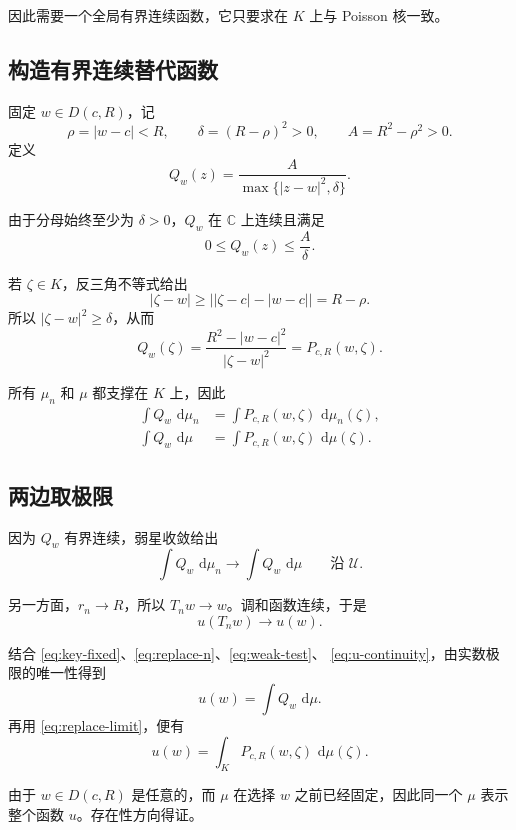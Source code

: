 \documentclass[11pt,a4paper]{article}
\theoremstyle{cnplain}
\theoremstyle{definition}
\newcommand{\C}{\mathbb C}
\newcommand{\dd}{\,\mathrm d}
\begin{document}
因此需要一个全局有界连续函数，它只要求在 $K$ 上与 Poisson 核一致。

\subsection{构造有界连续替代函数}

固定 $w\in D(c,R)$，记
\[
  \rho=|w-c|<R,\qquad
  \delta=(R-\rho)^2>0,\qquad
  A=R^2-\rho^2>0.
\]
定义
\begin{equation}\label{eq:Q-def}
  Q_w(z)=\frac{A}{\max\{|z-w|^2,\delta\}}.
\end{equation}

由于分母始终至少为 $\delta>0$，$Q_w$ 在 $\C$ 上连续且满足
\[
  0\le Q_w(z)\le \frac{A}{\delta}.
\]

若 $\zeta\in K$，反三角不等式给出
\[
  |\zeta-w|
  \ge\bigl||\zeta-c|-|w-c|\bigr|
  =R-\rho.
\]
所以 $|\zeta-w|^2\ge\delta$，从而
\[
  Q_w(\zeta)
  =\frac{R^2-|w-c|^2}{|\zeta-w|^2}
  =P_{c,R}(w,\zeta).
\]

所有 $\mu_n$ 和 $\mu$ 都支撑在 $K$ 上，因此
\begin{align}
  \int Q_w\,\dd\mu_n&=\int P_{c,R}(w,\zeta)\,\dd\mu_n(\zeta),
    \label{eq:replace-n}\\
  \int Q_w\,\dd\mu&=\int P_{c,R}(w,\zeta)\,\dd\mu(\zeta).
    \label{eq:replace-limit}
\end{align}

\subsection{两边取极限}

因为 $Q_w$ 有界连续，弱星收敛给出
\begin{equation}\label{eq:weak-test}
  \int Q_w\,\dd\mu_n
  \longrightarrow
  \int Q_w\,\dd\mu
  \qquad\text{沿 }\mathcal U.
\end{equation}

另一方面，$r_n\to R$，所以 $T_nw\to w$。调和函数连续，于是
\begin{equation}\label{eq:u-continuity}
  u(T_nw)\longrightarrow u(w).
\end{equation}

结合 \eqref{eq:key-fixed}、\eqref{eq:replace-n}、\eqref{eq:weak-test}、
\eqref{eq:u-continuity}，由实数极限的唯一性得到
\[
  u(w)=\int Q_w\,\dd\mu.
\]
再用 \eqref{eq:replace-limit}，便有
\[
  u(w)=\int_K P_{c,R}(w,\zeta)\,\dd\mu(\zeta).
\]

由于 $w\in D(c,R)$ 是任意的，而 $\mu$ 在选择 $w$ 之前已经固定，因此同一个 $\mu$ 表示整个函数 $u$。存在性方向得证。
\end{document}
